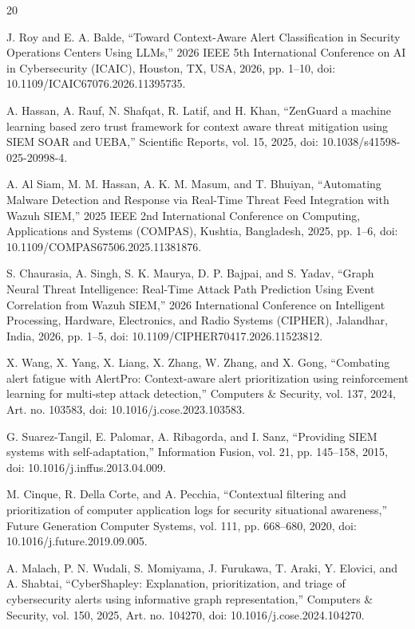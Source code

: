 \documentclass[conference]{IEEEtran}
\begin{document}
\begin{thebibliography}{20}
\scriptsize
\setlength{\itemsep}{0pt}
\setlength{\parskip}{0pt}
\setlength{\parsep}{0pt}

 J. Roy and E. A. Balde, ``Toward Context-Aware Alert Classification in Security Operations Centers Using LLMs,'' 2026 IEEE 5th International Conference on AI in Cybersecurity (ICAIC), Houston, TX, USA, 2026, pp. 1--10, doi: 10.1109/ICAIC67076.2026.11395735.

 A. Hassan, A. Rauf, N. Shafqat, R. Latif, and H. Khan, ``ZenGuard a machine learning based zero trust framework for context aware threat mitigation using SIEM SOAR and UEBA,'' Scientific Reports, vol. 15, 2025, doi: 10.1038/s41598-025-20998-4.

 A. Al Siam, M. M. Hassan, A. K. M. Masum, and T. Bhuiyan, ``Automating Malware Detection and Response via Real-Time Threat Feed Integration with Wazuh SIEM,'' 2025 IEEE 2nd International Conference on Computing, Applications and Systems (COMPAS), Kushtia, Bangladesh, 2025, pp. 1--6, doi: 10.1109/COMPAS67506.2025.11381876.

 S. Chaurasia, A. Singh, S. K. Maurya, D. P. Bajpai, and S. Yadav, ``Graph Neural Threat Intelligence: Real-Time Attack Path Prediction Using Event Correlation from Wazuh SIEM,'' 2026 International Conference on Intelligent Processing, Hardware, Electronics, and Radio Systems (CIPHER), Jalandhar, India, 2026, pp. 1--5, doi: 10.1109/CIPHER70417.2026.11523812.

 X. Wang, X. Yang, X. Liang, X. Zhang, W. Zhang, and X. Gong, ``Combating alert fatigue with AlertPro: Context-aware alert prioritization using reinforcement learning for multi-step attack detection,'' Computers \& Security, vol. 137, 2024, Art. no. 103583, doi: 10.1016/j.cose.2023.103583.

 G. Suarez-Tangil, E. Palomar, A. Ribagorda, and I. Sanz, ``Providing SIEM systems with self-adaptation,'' Information Fusion, vol. 21, pp. 145--158, 2015, doi: 10.1016/j.inffus.2013.04.009.

 M. Cinque, R. Della Corte, and A. Pecchia, ``Contextual filtering and prioritization of computer application logs for security situational awareness,'' Future Generation Computer Systems, vol. 111, pp. 668--680, 2020, doi: 10.1016/j.future.2019.09.005.

 A. Malach, P. N. Wudali, S. Momiyama, J. Furukawa, T. Araki, Y. Elovici, and A. Shabtai, ``CyberShapley: Explanation, prioritization, and triage of cybersecurity alerts using informative graph representation,'' Computers \& Security, vol. 150, 2025, Art. no. 104270, doi: 10.1016/j.cose.2024.104270.


\end{thebibliography}
\end{document}
